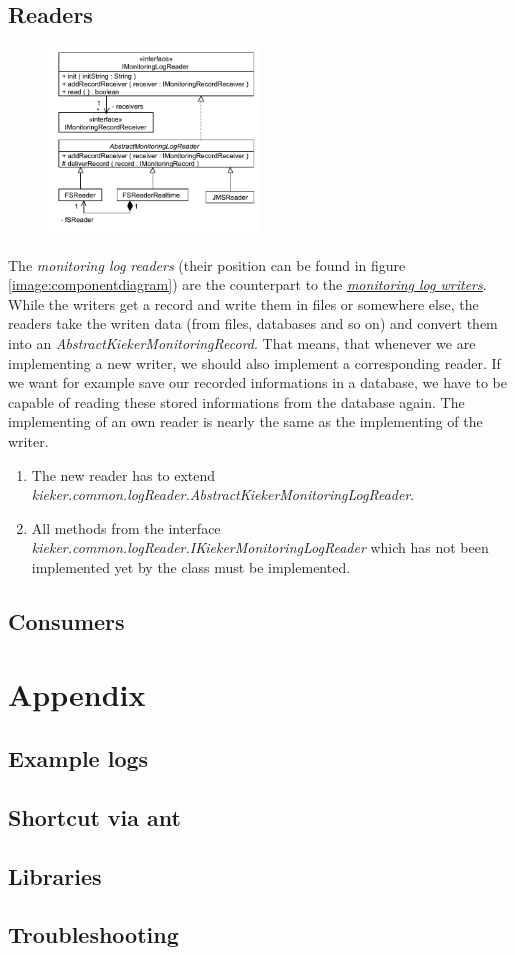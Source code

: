 \documentclass[a4paper, oneside, 11pt]{scrartcl}
\begin{document}
\subsection{Readers}
\begin{figure}[H]
	\begin{center}
		\includegraphics[width=0.5\textwidth]{kieker_readerimpls.pdf}
		\label{image:readers}
		\caption{}
	\end{center}
\end{figure}
The \textit{monitoring log readers} (their position can be found in figure \ref{image:componentdiagram}) are the counterpart to the \hyperlink{monitoringlogwriters}{\textit{monitoring log writers}}. While the writers get a record and write them in files or somewhere else, the readers take the writen data (from files, databases and so on) and convert them into an \textit{AbstractKiekerMonitoringRecord}. That means, that whenever we are implementing a new writer, we should also implement a corresponding reader. If we want for example save our recorded informations in a database, we have to be capable of reading these stored informations from the database again. The implementing of an own reader is nearly the same as the implementing of the writer.
\begin{enumerate}
 \item The new reader has to extend \textit{kieker.common.logReader.AbstractKiekerMonitoringLogReader}.
 \item All methods from the interface  \textit{kieker.common.logReader.IKiekerMonitoringLogReader} which has not been implemented yet by the class must be implemented.
\end{enumerate}

\subsection{Consumers}

\section{Appendix}
\subsection{Example logs}
\subsection{Shortcut via ant}
\subsection{Libraries}

\subsection{Troubleshooting}
\end{document}
